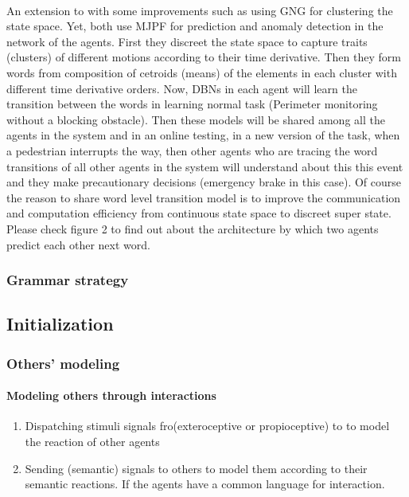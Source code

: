 \documentclass{article}
\begin{document}
			\paragraph{\cite{kanapram-2020-collective-awareness-for-abnormality-detection-in-connected-autonomous-vehicles}} An extension to \cite{kanapram-2019-self-awareness-in-intelligent-vehicles-experience-based-abnormality-detection} with some improvements such as using GNG for clustering the state space. Yet, both use MJPF for prediction and anomaly detection in the network of the agents. First they discreet the state space to capture traits (clusters) of different motions according to their time derivative. Then they form words  from composition of cetroids (means) of the elements in each cluster with different time derivative orders.  Now, DBNs in each agent will learn the transition between the words in learning normal task (Perimeter monitoring without a blocking obstacle).  Then these models will be shared among all the agents in the system and in an online testing, in a new version of the task, when a pedestrian interrupts the way, then other agents who are tracing the word transitions of all other agents in the system will understand about this  this event and they make precautionary decisions (emergency brake in this case).  Of course the reason to share word level transition model is to improve the communication and computation efficiency from continuous state space to discreet super state. Please check figure 2 to find out about the architecture by which two agents predict each other next word.
		\subsubsection{Grammar strategy}
	\subsection{Initialization}
		\subsubsection{Others' modeling}
			\paragraph{Modeling others through interactions}
				\begin{enumerate}
					\item Dispatching stimuli signals fro(exteroceptive or propioceptive) to to model the reaction of other agents
					\item Sending (semantic) signals to others to model them according to their semantic reactions. If the agents have a common language for interaction.
				\end{enumerate}
\end{document}
